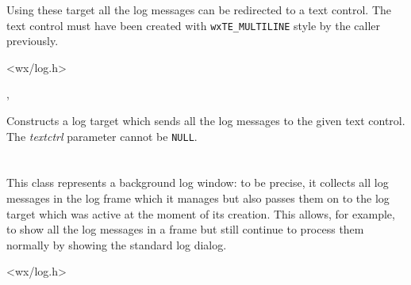 Using these target all the log messages can be redirected to a text control.
The text control must have been created with {\tt wxTE\_MULTILINE} style by the
caller previously.




<wx/log.h>


,\\




Constructs a log target which sends all the log messages to the given text
control. The {\it textctrl} parameter cannot be {\tt NULL}.


\section{}\label{wxlogwindow}

This class represents a background log window: to be precise, it collects all
log messages in the log frame which it manages but also passes them on to the
log target which was active at the moment of its creation. This allows, for
example, to show all the log messages in a frame but still continue to process
them normally by showing the standard log dialog.




<wx/log.h>






